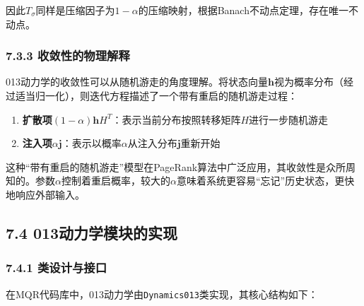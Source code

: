 \documentclass[
  12pt,
]{article}
\providecommand{\tightlist}{%
  \setlength{\itemsep}{0pt}\setlength{\parskip}{0pt}}
\begin{document}
因此\(T_\sigma\)同样是压缩因子为\(1-\alpha\)的压缩映射，根据Banach不动点定理，存在唯一不动点。

\hypertarget{ux6536ux655bux6027ux7684ux7269ux7406ux89e3ux91ca}{%
\subsubsection{7.3.3
收敛性的物理解释}\label{ux6536ux655bux6027ux7684ux7269ux7406ux89e3ux91ca}}

013动力学的收敛性可以从随机游走的角度理解。将状态向量\(\textbf{h}\)视为概率分布（经过适当归一化），则迭代方程描述了一个带有重启的随机游走过程：

\begin{enumerate}
\def\labelenumi{\arabic{enumi}.}
\tightlist
\item
  \textbf{扩散项}\((1-\alpha)\textbf{h}H^T\)：表示当前分布按照转移矩阵\(H\)进行一步随机游走
\item
  \textbf{注入项}\(\alpha\textbf{j}\)：表示以概率\(\alpha\)从注入分布\(\textbf{j}\)重新开始
\end{enumerate}

这种``带有重启的随机游走''模型在PageRank算法中广泛应用，其收敛性是众所周知的。参数\(\alpha\)控制着重启概率，较大的\(\alpha\)意味着系统更容易``忘记''历史状态，更快地响应外部输入。

\hypertarget{ux52a8ux529bux5b66ux6a21ux5757ux7684ux5b9eux73b0}{%
\subsection{7.4
013动力学模块的实现}\label{ux52a8ux529bux5b66ux6a21ux5757ux7684ux5b9eux73b0}}

\hypertarget{ux7c7bux8bbeux8ba1ux4e0eux63a5ux53e3}{%
\subsubsection{7.4.1
类设计与接口}\label{ux7c7bux8bbeux8ba1ux4e0eux63a5ux53e3}}

在MQR代码库中，013动力学由\texttt{Dynamics013}类实现，其核心结构如下：
\end{document}

